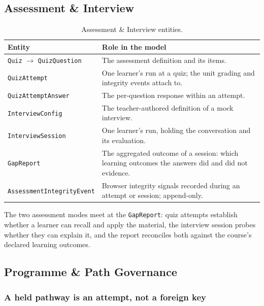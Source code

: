 \subsection{Assessment \& Interview}

\begin{table}[H]
\centering
\renewcommand{\arraystretch}{1.25}
\small
\begin{tabular}{|>{\raggedright\arraybackslash}m{}|>{\raggedright\arraybackslash}m{}|}
\hline
\textbf{Entity} & \textbf{Role in the model} \\ \hline
\texttt{Quiz} $\rightarrow$ \texttt{QuizQuestion} & The assessment definition and its items. \\ \hline
\texttt{QuizAttempt} & One learner's run at a quiz; the unit grading and integrity events attach to. \\ \hline
\texttt{QuizAttemptAnswer} & The per-question response within an attempt. \\ \hline
\texttt{InterviewConfig} & The teacher-authored definition of a mock interview. \\ \hline
\texttt{InterviewSession} & One learner's run, holding the conversation and its evaluation. \\ \hline
\texttt{GapReport} & The aggregated outcome of a session: which learning outcomes the answers did and did not evidence. \\ \hline
\texttt{AssessmentIntegrityEvent} & Browser integrity signals recorded during an attempt or session; append-only. \\ \hline
\end{tabular}
\caption{Assessment \& Interview entities.}
\label{tab:class_assessment}
\end{table}

\noindent The two assessment modes meet at the \texttt{GapReport}: quiz attempts establish whether a learner can recall and apply the material, the interview session probes whether they can explain it, and the report reconciles both against the course's declared learning outcomes.

\subsection{Programme \& Path Governance}

\subsubsection{A held pathway is an attempt, not a foreign key}

